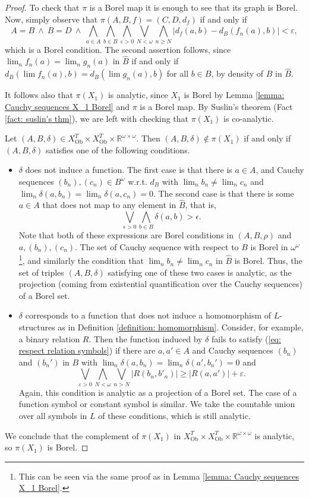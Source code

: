 \documentclass[12pt]{amsart}
\DeclareMathOperator{\Ob}{Ob}
\newcommand{\theory}{T}
\begin{document}
\begin{proof}
    To check that $\pi$ is a Borel map it is enough to see that its graph is Borel.
    Now, simply observe that $\pi(A,B,f)=(C,D,d_f)$ if and only if 
    \[A=B~\wedge~B=D~\wedge ~ \bigwedge_{a\in A}\bigwedge_{b\in B}\bigwedge_{\varepsilon>0}\bigvee_{N<\omega}\bigwedge_{n\geq N}\big|d_f(a,b)-d_B(f_n(a),b)\big|<\varepsilon,\]
    which is a Borel condition. The second assertion follows, since $\lim_n f_n(a)=\lim_n g_n(a)$ in $\widehat{B}$ if and only if $d_B(\lim f_n(a),b)=d_B(\lim g_n(a),b)$ for all $b\in B$, by density of $B$ in $\widehat{B}$.

    It follows also that $\pi(X_1)$ is analytic, since $X_1$ is Borel by Lemma \ref{lemma: Cauchy sequences X_1 Borel} and $\pi$ is a Borel map. By Suslin's theorem (Fact \ref{fact: suslin's thm}), we are left with checking that $\pi(X_1)$ is co-analytic.

    Let $(A,B,\delta)\in X^{\theory}_{\Ob}\times X^{\theory}_{\Ob}\times {\mathbb R}^{\omega\times\omega}$. Then $(A,B,\delta)\notin \pi(X_1)$ if and only if $(A,B,\delta)$ satisfies one of the following conditions.
    \begin{itemize}
        \item $\delta$ does not induce a function. The first case is that there is $a\in A$, and Cauchy sequences $(b_n),(c_n)\in B^\omega$ w.r.t. $d_B$ with $\lim_n b_n\neq\lim_n c_n$ and $\lim_n\delta(a,b_n)=\lim_n\delta(a,c_n)=0$.
        The second case is that there is some $a\in A$ that does not map to any element in $\widehat{B}$, that is, 
        \[\bigvee_{\epsilon>0}\bigwedge_{b\in B}\delta(a,b)>\epsilon.\]
        Note that both of these expressions are Borel conditions in $(A,B,\rho)$ and $a,(b_n),(c_n)$. The set of Cauchy sequence with respect to $B$ is Borel in $\omega^\omega$\footnote{This can be seen via the same proof as in Lemma \ref{lemma: Cauchy sequences X_1 Borel}.}, and similarly the condition that $\lim_nb_n\neq \lim_n c_n$ in $\widehat{B}$ is Borel. Thus, the set of triples $(A,B,\delta)$ satisfying one of these two cases is analytic, as the projection (coming from existential quantification over the Cauchy sequences) of a Borel set. 
        \item $\delta$ corresponds to a function that does not induce a homomorphism of ${L}$-structures as in Definition \ref{definition: homomorphism}. Consider, for example, a binary relation $R$. Then the function induced by $\delta$ fails to satisfy (\ref{eq: respect relation symbols}) if there are $a,a'\in A$ and Cauchy sequences $(b_n)$ and $ (b_n')$ in $B$ with $\lim_n\delta(a,b_n)=\lim_n\delta(a',b_n')=0$
        and
        \[ \bigvee_{\varepsilon > 0} \bigwedge_{N<\omega} \bigvee_{n>N} |R(b_n, b'_n)|\geq |R(a,a')| +\varepsilon .\]
        Again, this condition is analytic as a projection of a Borel set. The case of a function symbol or constant symbol is similar. We take the countable union over all symbols in $L$ of these conditions, which is still analytic. 
    \end{itemize}
    We conclude that the complement of $\pi(X_1)$ in $X^{\theory}_{\Ob}\times X^{\theory}_{\Ob}\times{\mathbb R}^{\omega\times\omega}$ is analytic, so $\pi(X_1)$ is Borel.
\end{proof} 
\end{document}
